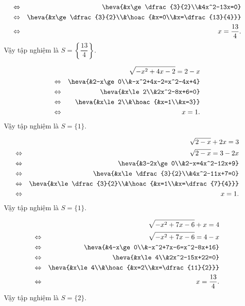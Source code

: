 \begin{bt}
{\begin{listEX}[1]
\begin{eqnarray*}
				&\Leftrightarrow& \heva{&x\ge \dfrac{3}{2}\\&4x^2-13x=0}\\
				&\Leftrightarrow& \heva{&x\ge \dfrac{3}{2}\\&\hoac{&x=0\\&x=\dfrac{13}{4}}}\\
				&\Leftrightarrow& x=\dfrac{13}{4}.
			\end{eqnarray*}	
			Vậy tập nghiệm là $S=\left\{\dfrac{13}{4}\right\}$.	
			\item
			\begin{eqnarray*}
				&&\sqrt{-x^2+4x-2}=2-x\\
				&\Leftrightarrow& \heva{&2-x\ge 0\\&-x^2+4x-2=x^2-4x+4}\\
				&\Leftrightarrow& \heva{&x\le 2\\&2x^2-8x+6=0}\\
				&\Leftrightarrow& \heva{&x\le 2\\&\hoac{&x=1\\&x=3}}\\
				&\Leftrightarrow& x=1.
			\end{eqnarray*}	
			Vậy tập nghiệm là $S=\{1\}$.	
			\item 
			\begin{eqnarray*}
				&&\sqrt{2-x}+2x=3\\
				&\Leftrightarrow&\sqrt{2-x}=3-2x\\
				&\Leftrightarrow& \heva{&3-2x\ge 0\\&2-x=4x^2-12x+9}\\
				&\Leftrightarrow& \heva{&x\le \dfrac{3}{2}\\&4x^2-11x+7=0}\\
				&\Leftrightarrow& \heva{&x\le \dfrac{3}{2}\\&\hoac{&x=1\\&x=\dfrac{7}{4}}}\\
				&\Leftrightarrow& x=1.
			\end{eqnarray*}	
			Vậy tập nghiệm là $S=\{1\}$.	
			\item 
			\begin{eqnarray*}
				&&\sqrt{-x^2+7x-6}+x=4\\
				&\Leftrightarrow&\sqrt{-x^2+7x-6}=4-x\\
				&\Leftrightarrow& \heva{&4-x\ge 0\\&-x^2+7x-6=x^2-8x+16}\\
				&\Leftrightarrow& \heva{&x\le 4\\&2x^2-15x+22=0}\\
				&\Leftrightarrow& \heva{&x\le 4\\&\hoac{&x=2\\&x=\dfrac{11}{2}}}\\
				&\Leftrightarrow& x=\dfrac{13}{4}.
			\end{eqnarray*}	
			Vậy tập nghiệm là $S=\{2\}$.	
		\end{listEX}
	} 
\end{bt}




